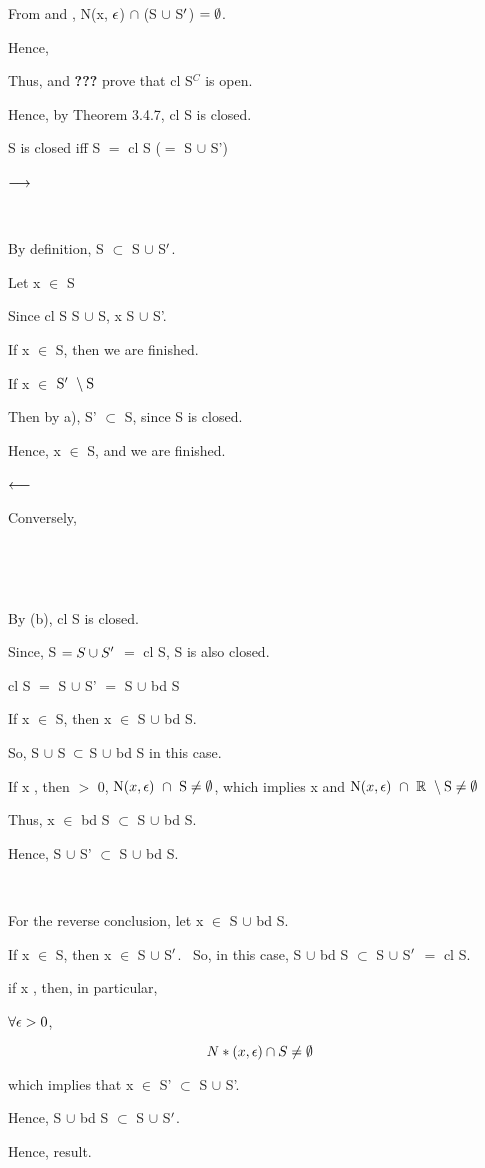 \documentclass{article}
\begin{document}

From  and , N(x, $\epsilon$) $\cap$ (S $\cup$ S$^\prime$) $= \emptyset$. \

Hence, 

Thus,  and \textbf{???} prove that cl S$^C$ is open. \

Hence, by Theorem 3.4.7, cl S is closed.

 S is closed iff S $=$ cl S ($=$ S $\cup$ S') \

$\longrightarrow$ \


 \

By definition, S $\subset$ S $\cup$ S$^\prime$. \


Let x $\in$ S

Since cl S \eql S $\cup$ S\pr, x \mem S $\cup$ S'. \

If x $\in$ S, then we are finished. \

If x $\in$ $\textrm{S\ensuremath{^\prime} }\setminus{\textrm{S}}$ \

Then by a), S' $\subset$ S, since S is closed.

Hence, x $\in$ S, and we are finished.\

$\longleftarrow$ \

Conversely, \

 \

\

By (b), cl S is closed. \

Since, S $= S \cup S^\prime$ $=$ cl S, S is also closed.



 cl S $=$ S $\cup$ S' $=$ S $\cup$ bd S \


If x $\in$ S, then x $\in$ S $\cup$ bd S.\

So, S $\cup$ S\ $\subset$ S $\cup$ bd S in this case. \

If x \mem {}, then \fa \ep $>$ 0, $\textrm{N(}x, \epsilon\textrm{) }\cap \textrm{ S} \neq \emptyset$, which implies x \mem {} and $\textrm{N(}x, \epsilon\textrm{) }\cap \textrm{ $\textrm{\ensuremath{\mathbb{R}} }\setminus{\textrm{S}}$} \neq \emptyset$ \

Thus, x $\in$ bd S $\subset$ S $\cup$ bd S. \

Hence, S $\cup$ S' $\subset$ S $\cup$ bd S. \

\

For the reverse conclusion, let x $\in$ S $\cup$ bd S. \

If x $\in$ S, then x $\in$ S $\cup$ S$^\prime$. \
So, in this case, S $\cup$ bd S $\subset$ S $\cup$ S$^\prime$ $=$ cl S. \

if x \mem {}, then, in particular, \

$\forall \epsilon > 0$,

\[N*(x, \epsilon) \cap S \neq \emptyset\]

which implies that x $\in$ S' $\subset$ S $\cup$ S'. \

Hence, S $\cup$ bd S $\subset$ S $\cup$ S$^\prime$. \

Hence, result.



\epf
\end{document}
